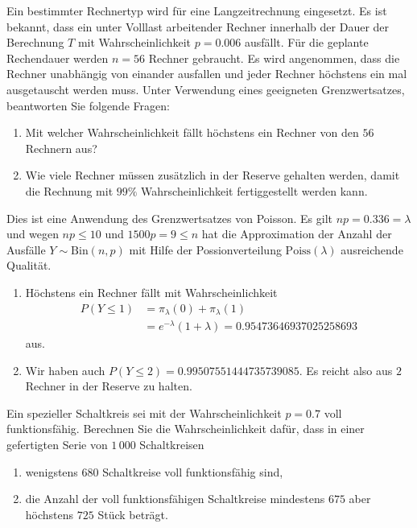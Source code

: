 Ein bestimmter Rechnertyp wird für eine Langzeitrechnung eingesetzt. Es ist
bekannt, dass ein unter Volllast arbeitender Rechner innerhalb der Dauer der
Berechnung $T$ mit Wahrscheinlichkeit $p=0.006$ ausfällt. Für die geplante
Rechendauer werden $n=56$ Rechner gebraucht. Es wird angenommen, dass die
Rechner unabhängig von einander ausfallen und jeder Rechner höchstens ein mal
ausgetauscht werden muss. Unter Verwendung eines geeigneten  Grenzwertsatzes,
beantworten Sie folgende Fragen:
\begin{enumerate}
    \item Mit welcher Wahrscheinlichkeit fällt höchstens ein Rechner von den
        $56$ Rechnern aus?
    \item Wie viele Rechner müssen zusätzlich in der Reserve gehalten werden,
        damit die Rechnung mit $99\%$ Wahrscheinlichkeit fertiggestellt werden
        kann. 
\end{enumerate}

\solution
Dies ist eine Anwendung des Grenzwertsatzes von Poisson. Es gilt $np= 0.336 =
\lambda$ und wegen $np\leq 10$ und $1500p = 9 \leq n$ hat die Approximation der
Anzahl der Ausfälle $Y \sim \text{Bin}(n,p)$ mit Hilfe der Possionverteilung
$\text{Poiss}(\lambda)$ ausreichende Qualität.
\begin{enumerate}
    \item Höchstens ein Rechner fällt mit Wahrscheinlichkeit 
        \begin{align*}
            P(Y \leq 1) &= \pi_{\lambda}(0) + \pi_{\lambda}(1) \\
            &= e^{-\lambda}\left( 1 + \lambda \right) = 0.95473646937025258693 
        \end{align*}
        aus.

    \item Wir haben auch $P(Y\leq 2) = 0.99507551444735739085$. Es reicht also aus $2$
        Rechner in der Reserve zu halten. 
\end{enumerate}


 Ein spezieller
Schaltkreis sei mit der Wahrscheinlichkeit $p=0.7$ voll funktionsfähig.
Berechnen Sie die Wahrscheinlichkeit dafür, dass in einer 
gefertigten Serie von $1\,000$ Schaltkreisen 
\begin{enumerate}
    \item wenigstens $680$ Schaltkreise voll funktionsfähig sind,

    \item die Anzahl der voll funktionsfähigen Schaltkreise mindestens
        $675$ aber höchstens $725$ Stück beträgt.
\end{enumerate}

